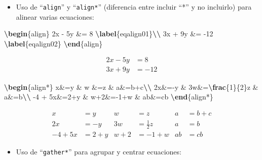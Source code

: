\documentclass[12pt,a4paper,]{book}
\newenvironment{Shaded}{\begin{snugshade}}{\end{snugshade}}
\newcommand{\ExtensionTok}[1]{#1}
\newcommand{\KeywordTok}[1]{\textcolor[rgb]{0.13,0.29,0.53}{\textbf{#1}}}
\newcommand{\NormalTok}[1]{#1}
\newcommand{\SpecialCharTok}[1]{\textcolor[rgb]{0.81,0.36,0.00}{\textbf{#1}}}
\newcommand{\SpecialStringTok}[1]{\textcolor[rgb]{0.31,0.60,0.02}{#1}}
\providecommand{\tightlist}{%
  \setlength{\itemsep}{0pt}\setlength{\parskip}{0pt}}
\numberwithin{dummy}{section}
\theoremstyle{ocrenumbox}
\theoremstyle{blacknumex}
\theoremstyle{blacknumbox}
\theoremstyle{ocrenum}
\theoremstyle{ocrenum}
\begin{document}
\begin{itemize}
\tightlist
\item
  Uso de ``\texttt{align}'' y ``\texttt{align*}'' (diferencia entre
  incluir ``*'' y no incluirlo) para alinear varias ecuaciones:
\end{itemize}

\begin{Shaded}
\begin{Highlighting}[]
\KeywordTok{\textbackslash{}begin}\NormalTok{\{}\ExtensionTok{align}\NormalTok{\}}\SpecialStringTok{ }
\SpecialStringTok{2x {-} 5y \&=  8  }\SpecialCharTok{\textbackslash{}label}\SpecialStringTok{\{eqalign01\}}\SpecialCharTok{\textbackslash{}\textbackslash{}}\SpecialStringTok{ }
\SpecialStringTok{3x + 9y \&=  {-}12 }\SpecialCharTok{\textbackslash{}label}\SpecialStringTok{\{eqalign02\}}
\KeywordTok{\textbackslash{}end}\NormalTok{\{}\ExtensionTok{align}\NormalTok{\}}
\end{Highlighting}
\end{Shaded}

\begin{align} 
2x - 5y &=  8  \label{eqalign01}\\ 
3x + 9y &=  -12 \label{eqalign02}
\end{align}

\begin{Shaded}
\begin{Highlighting}[]
\KeywordTok{\textbackslash{}begin}\NormalTok{\{}\ExtensionTok{align*}\NormalTok{\}}
\SpecialStringTok{x\&=y           \&  w \&=z              \&  a\&=b+c}\SpecialCharTok{\textbackslash{}\textbackslash{}}
\SpecialStringTok{2x\&={-}y         \&  3w\&=}\SpecialCharTok{\textbackslash{}frac}\SpecialStringTok{\{1\}\{2\}z   \&  a\&=b}\SpecialCharTok{\textbackslash{}\textbackslash{}}
\SpecialStringTok{{-}4 + 5x\&=2+y   \&  w+2\&={-}1+w          \&  ab\&=cb}
\KeywordTok{\textbackslash{}end}\NormalTok{\{}\ExtensionTok{align*}\NormalTok{\}}
\end{Highlighting}
\end{Shaded}

\begin{align*}
x&=y           &  w &=z              &  a&=b+c\\
2x&=-y         &  3w&=\frac{1}{2}z   &  a&=b\\
-4 + 5x&=2+y   &  w+2&=-1+w          &  ab&=cb
\end{align*}

\begin{itemize}
\tightlist
\item
  Uso de ``\texttt{gather*}'' para agrupar y centrar ecuaciones:
\end{itemize}
\end{document}
